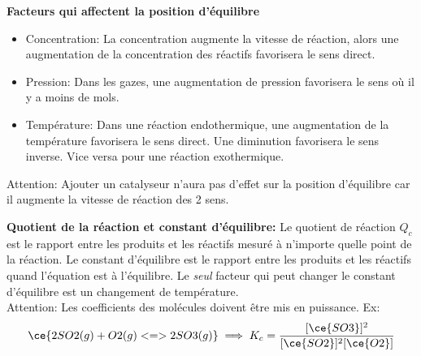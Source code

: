 \documentclass[french, a4paper, 12pt]{article}
\begin{document}
\vspace{0.5em}
\textbf{Facteurs qui affectent la position d'équilibre}
\begin{itemize}
\item Concentration: La concentration augmente la vitesse de réaction, alors une augmentation de la concentration des réactifs favorisera le sens direct.
\item Pression: Dans les gazes, une augmentation de pression favorisera le sens où il y a moins de mols.
\item Température: Dans une réaction endothermique, une augmentation de la température favorisera le sens direct. Une diminution favorisera le sens inverse. Vice versa pour une réaction exothermique.
\end{itemize}
Attention: Ajouter un catalyseur n'aura pas d'effet sur la position d'équilibre car il augmente la vitesse de réaction des 2 sens.

\vspace{0.5em}
\textbf{Quotient de la réaction et constant d'équilibre:}
Le quotient de réaction $Q_c$ est le rapport entre les produits et les réactifs mesuré à n'importe quelle point de la réaction. Le constant d'équilibre est le rapport entre les produits et les réactifs quand l'équation est à l'équilibre. Le \emph{seul} facteur qui peut changer le constant d'équilibre est un changement de température.\\
Attention: Les coefficients des molécules doivent être mis en puissance. Ex:
\[
\ce{2SO2(g) + O2(g) <=> 2SO3(g)} \implies K_c = \frac{[\ce{SO3}]^2}{[\ce{SO2}]^2[\ce{O2}]}
\]
\pagebreak
\end{document}
